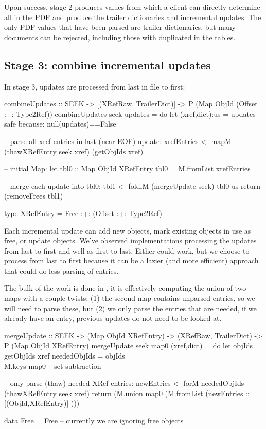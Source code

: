 Upon success, stage 2 produces values from which a client can directly determine all \objids{} in the PDF and produce the trailer dictionaries and incremental updates.
%
The only PDF values that have been parsed are trailer dictionaries, but many documents can be rejected, including those with duplicated \objids{} in the \xref{} tables.

\subsection{Stage 3: combine incremental updates}
\label{sec:stage-3}
%
In stage 3, updates are processed from last in file to first:
\begin{code}
combineUpdates :: SEEK
               -> [(XRefRaw, TrailerDict)] 
               -> P (Map ObjId (Offset :+: Type2Ref))
combineUpdates seek updates =
    do
    let (xref,dict):us = updates -- safe because: null(updates)==False

    -- parse all xref entries in last (near EOF) update:
    xrefEntries <- mapM (thawXRefEntry seek xref) (getObjIds xref)

    -- initial Map:
    let tbl0 :: Map ObjId XRefEntry
        tbl0 = M.fromList xrefEntries

    -- merge each update into tbl0:
    tbl1  <- foldlM (mergeUpdate seek) tbl0 us
    return (removeFrees tbl1)

type XRefEntry = Free :+: (Offset :+: Type2Ref)
\end{code}

Each incremental update can add new objects, mark existing objects in use as free, or update objects.
We've observed implementations processing the updates from last to first and well as first to last.
Either could work, but we choose to process from last to first because it can be a lazier 
(and more efficient)
approach that could do less parsing of  entries.

The bulk of the work is done in , 
it is effectively computing the union of two maps with a couple twists:
(1) the second map  contains unparsed \xref{} entries,
so we will need to parse these, but
(2) we only parse the \xref{} entries that are needed, if we already have
an entry, previous updates do not need to be looked at.

\begin{code}
mergeUpdate :: SEEK
            ->  (Map ObjId XRefEntry)
            -> (XRefRaw, TrailerDict)
            -> P (Map ObjId XRefEntry)
mergeUpdate seek map0 (xref,dict) =
    do
    let objIds       = getObjIds xref
        neededObjIds = objIds \\ M.keys map0
                       -- set subtraction

    -- only parse (thaw) needed XRef entries:
    newEntries <- forM neededObjIds
                       (thawXRefEntry seek xref)
    return
      (M.union map0 (M.fromList (newEntries :: [(ObjId,XRefEntry)] )))

data Free = Free  -- currently we are ignoring free objects
\end{code}


